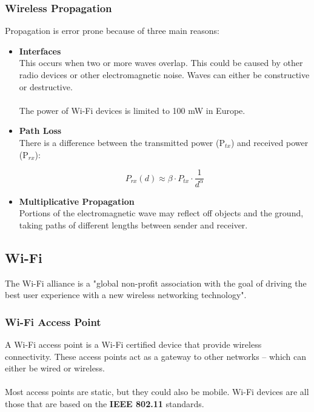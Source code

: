 \documentclass{article}
\begin{document}
\subsubsection{Wireless Propagation}
Propagation is error prone because of three main reasons:

\begin{itemize}
	\item \textbf{Interfaces}
	\vspace{.2cm} \\
	This occurs when two or more waves overlap. This could be caused by other radio devices or other electromagnetic noise. Waves can either be constructive or destructive. \\ \\
	The power of Wi-Fi devices is limited to 100 mW in Europe.
	
	\item \textbf{Path Loss}
	\vspace{.2cm} \\
	There is a difference between the transmitted power (P$_{tx}$) and received power (P$_{rx}$):
	
	\[ P_{rx}(d) \approx \beta \cdot P_{tx} \cdot \frac{1}{d^\alpha} \]
	
	\item \textbf{Multiplicative Propagation}
	\vspace{.2cm} \\
	Portions of the electromagnetic wave may reflect off objects and the ground, taking paths of different lengths between sender and receiver.	
\end{itemize}

\subsection{Wi-Fi}
The Wi-Fi alliance is a "global non-profit association with the goal of driving the best user experience with a new wireless networking technology".

\subsubsection{Wi-Fi Access Point}
A Wi-Fi access point is a Wi-Fi certified device that provide wireless connectivity. These access points act as a gateway to other networks -- which can either be wired or wireless. \\ \\
Most access points are static, but they could also be mobile. Wi-Fi devices are all those that are based on the \textbf{IEEE 802.11} standards.
\end{document}
